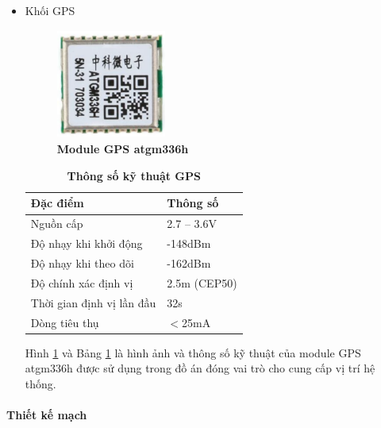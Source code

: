 \documentclass{article} %
\begin{document}
\begin{itemize}
		\item Khối GPS
		\begin{figure}[!ht]
			\centering
			\includegraphics[width=3.6cm,height=3.6cm]{Images/GPSModule.png}
			\caption[Module GPS atgm336h5\cite{GPS_mol}]{\bfseries \fontsize{12pt}{0pt}\selectfont Module GPS atgm336h\cite{GPS_mol}}
			\label{GPSModule}
		\end{figure}
		\begin{table}[H]
			\centering
			\begin{tabular}{|l|l|}
				\hline
				Đặc điểm                  & Thông số        \\ \hline
				Nguồn cấp                 & 2.7 – 3.6V      \\ \hline
				Độ nhạy khi khởi động     & -148dBm         \\ \hline
				Độ nhạy khi theo dõi      & -162dBm         \\ \hline
				Độ chính xác định vị      & 2.5m (CEP50)    \\ \hline
				Thời gian định vị lần đầu & 32s             \\ \hline
				Dòng tiêu thụ             & $<$25mA \\ \hline
			\end{tabular}
			\caption[Thông số kỹ thuật GPS\cite{GPS}]{\bfseries\fontsize{12pt}{0pt}\selectfont Thông số kỹ thuật GPS\cite{GPS}}
			\label{TsGPS}
		\end{table}
		
		Hình \ref{GPSModule} và Bảng \ref{TsGPS} là hình ảnh và thông số kỹ thuật của module GPS atgm336h được sử dụng trong đồ án đóng vai trò cho cung cấp vị trí hệ thống.
	\end{itemize}
	\paragraph{Thiết kế mạch}\mbox{}
	
\end{document}
